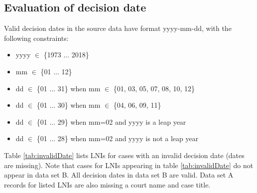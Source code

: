 \documentclass[10pt, letterpaper]{article}
\begin{document}
\begin{spacing}{1.0}

\clearpage

\section{Evaluation of decision date}

Valid decision dates in the source data have format yyyy-mm-dd, with the following constraints:

\begin{itemize}\setlength\itemsep{1pt}
    \item yyyy $\in$ \{1973 ... 2018\}
    \item mm $\in$ \{01 ... 12\}
    \item dd $\in$ \{01 ... 31\} when mm $\in$ \{01, 03, 05, 07, 08, 10, 12\}
    \item dd $\in$ \{01 ... 30\} when mm $\in$ \{04, 06, 09, 11\}
    \item dd $\in$ \{01 ... 29\} when mm=02 and yyyy is a leap year
    \item dd $\in$ \{01 ... 28\} when mm=02 and yyyy is not a leap year
\end{itemize}

\vspace{6pt}

Table \ref{tab:invalidDate} lists LNIs for cases with an invalid decision date (dates are missing).  Note that cases for LNIs appearing in table \ref{tab:invalidDate} do not appear in data set B.  All decision dates in data set B are valid.  Data set A records for listed LNIs are also missing a court name and case title.

\vspace{6pt}
    

\end{spacing}
\end{document}
